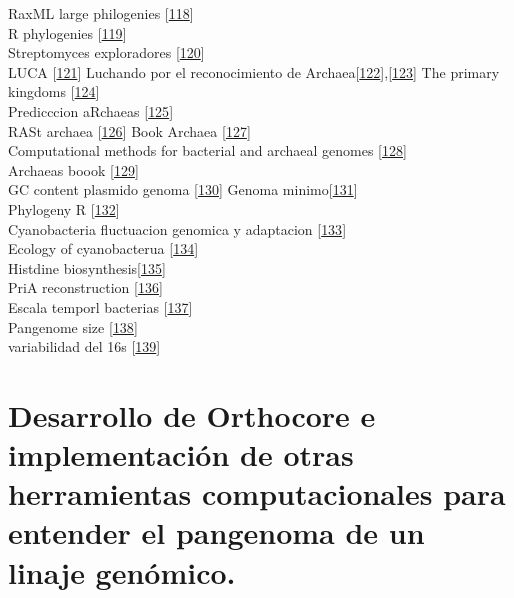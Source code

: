 \documentclass[12pt,twoside]{reedthesis}
\begin{document}
  RaxML large philogenies
  {[}\protect\hyperlink{ref-stamatakis_raxml_2014}{118}{]}\\
  R phylogenies
  {[}\protect\hyperlink{ref-phyloseq_powerful_2016}{119}{]}\\
  Streptomyces exploradores
  {[}\protect\hyperlink{ref-zacharia_exploring_2017}{120}{]}\\
  LUCA {[}\protect\hyperlink{ref-woese_universal_1998}{121}{]} Luchando
  por el reconocimiento de
  Archaea{[}\protect\hyperlink{ref-woese_are_1981}{122}{]},{[}\protect\hyperlink{ref-woese_towards_1990}{123}{]}
  The primary kingdoms
  {[}\protect\hyperlink{ref-woese_phylogenetic_1977}{124}{]}\\
  Predicccion aRchaeas
  {[}\protect\hyperlink{ref-woese_there_1994}{125}{]}\\
  RASt archaea {[}\protect\hyperlink{ref-graham_archaeal_2000}{126}{]}
  Book Archaea
  {[}\protect\hyperlink{ref-howland_surprising_2000}{127}{]}\\
  Computational methods for bacterial and archaeal genomes
  {[}\protect\hyperlink{ref-xu_computational_2008}{128}{]}\\
  Archaeas boook {[}\protect\hyperlink{ref-garrett_archaea_2008}{129}{]}\\
  GC content plasmido genoma
  {[}\protect\hyperlink{ref-nishida_evolution_2012}{130}{]} Genoma
  minimo{[}\protect\hyperlink{ref-coyle_mysteries_2016}{131}{]}\\
  Phylogeny R {[}\protect\hyperlink{ref-omeara_cran_2016}{132}{]}\\
  Cyanobacteria fluctuacion genomica y adaptacion
  {[}\protect\hyperlink{ref-larsson_genome_2011}{133}{]}\\
  Ecology of cyanobacterua
  {[}\protect\hyperlink{ref-whitton_ecology_2012}{134}{]}\\
  Histdine
  biosynthesis{[}\protect\hyperlink{ref-cohen_biosynthesis_2004}{135}{]}\\
  PriA reconstruction
  {[}\protect\hyperlink{ref-plach_long-term_2016}{136}{]}\\
  Escala temporl bacterias
  {[}\protect\hyperlink{ref-battistuzzi_genomic_2004}{137}{]}\\
  Pangenome size
  {[}\protect\hyperlink{ref-lapierre_estimating_2009}{138}{]}\\
  variabilidad del 16s
  {[}\protect\hyperlink{ref-vetrovsky_variability_2013}{139}{]}
  
  \chapter{Desarrollo de Orthocore e implementación de otras herramientas
  computacionales para entender el pangenoma de un linaje
  genómico.}\label{desarrollo-de-orthocore-e-implementacion-de-otras-herramientas-computacionales-para-entender-el-pangenoma-de-un-linaje-genomico.}
  
\end{document}
